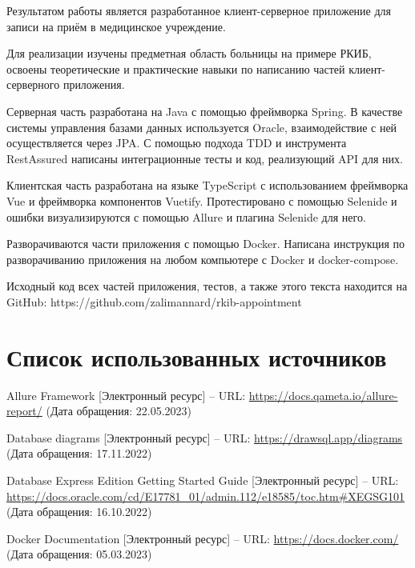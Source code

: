 \documentclass[a4paper,article]{article}
\begin{document}
\begin{sloppypar}
    Результатом работы является разработанное клиент-серверное приложение для записи на приём в медицинское учреждение.
    
    Для реализации изучены предметная область больницы на примере РКИБ, освоены теоретические и практические навыки по написанию частей клиент-серверного приложения. 
    
    Серверная часть разработана на Java с помощью фреймворка Spring. В качестве системы управления базами данных используется Oracle, взаимодействие с ней осуществляется через JPA. С помощью подхода TDD и инструмента RestAssured написаны интеграционные тесты и код, реализующий API для них.
    
    Клиентская часть разработана на языке TypeScript с использованием фреймворка Vue и фреймворка компонентов Vuetify. Протестировано с помощью Selenide и ошибки визуализируются с помощью Allure и плагина Selenide для него.
    
    Разворачиваются части приложения с помощью Docker. Написана инструкция по разворачиванию приложения на любом компьютере с Docker и docker-compose.
    
    Исходный код всех частей приложения, тестов, а также этого текста находится на GitHub: https://github.com/zalimannard/rkib-appointment

    \newpage

    \section*{Список использованных источников}

    \begin{enumerate}[leftmargin=*, itemindent=\labelwidth]
        
         Allure Framework [Электронный ресурс] -- URL: \url{https://docs.qameta.io/allure-report/} (Дата обращения: 22.05.2023)
        
         Database diagrams [Электронный ресурс] -- URL: \url{https://drawsql.app/diagrams} (Дата обращения: 17.11.2022)
        
         Database Express Edition Getting Started Guide [Электронный ресурс] -- URL: \url{https://docs.oracle.com/cd/E17781_01/admin.112/e18585/toc.htm#XEGSG101} (Дата обращения: 16.10.2022)
        
         Docker Documentation [Электронный ресурс] -- URL: \url{https://docs.docker.com/} (Дата обращения: 05.03.2023)
        

\end{enumerate}
\end{sloppypar}
\end{document}
